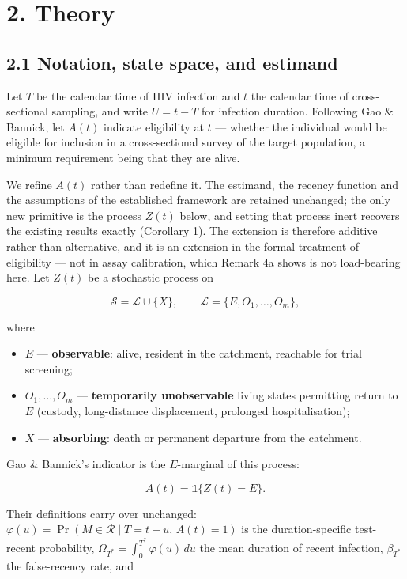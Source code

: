 \section{2. Theory}

\subsection{2.1 Notation, state space, and estimand}

Let \(T\) be the calendar time of HIV infection and \(t\) the calendar time of cross-sectional sampling, and write \(U = t-T\) for infection duration. Following Gao \& Bannick, let \(A(t)\) indicate eligibility at \(t\) --- whether the individual would be eligible for inclusion in a cross-sectional survey of the target population, a minimum requirement being that they are alive.

We refine \(A(t)\) rather than redefine it. The estimand, the recency function and the assumptions of the established framework are retained unchanged; the only new primitive is the process \(Z(t)\) below, and setting that process inert recovers the existing results exactly (Corollary 1). The extension is therefore additive rather than alternative, and it is an extension in the formal treatment of eligibility --- not in assay calibration, which Remark 4a shows is not load-bearing here. Let \(Z(t)\) be a stochastic process on

\[
\mathcal{S} = \mathcal{L}\cup\{X\}, \qquad \mathcal{L}=\{E, O_1,\dots,O_m\},
\]

where

\begin{itemize}
\tightlist
\item
  \(E\) --- \textbf{observable}: alive, resident in the catchment, reachable for trial screening;
\item
  \(O_1,\dots,O_m\) --- \textbf{temporarily unobservable} living states permitting return to \(E\) (custody, long-distance displacement, prolonged hospitalisation);
\item
  \(X\) --- \textbf{absorbing}: death or permanent departure from the catchment.
\end{itemize}

Gao \& Bannick's indicator is the \(E\)-marginal of this process:

\[
A(t) = \mathbb{1}\{Z(t)=E\}.
\]

Their definitions carry over unchanged: \(\varphi(u) = \Pr(M\in\mathcal{R}\mid T=t-u,\,A(t)=1)\) is the duration-specific test-recent probability, \(\Omega_{T^*}=\int_0^{T^*}\varphi(u)\,du\) the mean duration of recent infection, \(\beta_{T^*}\) the false-recency rate, and

